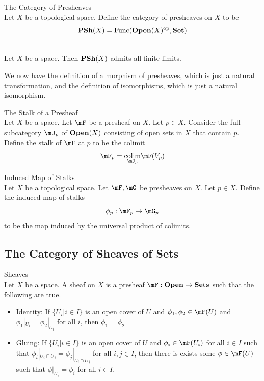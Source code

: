 \documentclass[a4paper]{article}
\begin{document}
\begin{defn}{The Category of Presheaves}{}\\
Let $X$ be a topological space. Define the category of presheaves on $X$ to be $$\bold{PSh}(X)=\text{Func}(\bold{Open}(X)^\text{op},\bold{Set})$$
\end{defn}

\begin{prp}{}{}\\
Let $X$ be a space. Then $\bold{PSh}(X)$ admits all finite limits. 
\end{prp}

We now have the definition of a morphism of presheaves, which is just a natural transformation, and the definition of isomorphisms, which is just a natural isomorphism. 

\begin{defn}{The Stalk of a Presheaf}{}\\
Let $X$ be a space. Let $\mF$ be a presheaf on $X$. Let $p\in X$. Consider the full subcategory $\mJ_p$ of $\bold{Open}(X)$ consisting of open sets in $X$ that contain $p$. Define the stalk of $\mF$ at $p$ to be the colimit $$\mF_p=\underset{\mJ_p}{\text{colim}}\mF(V_p)$$
\end{defn}

\begin{defn}{Induced Map of Stalks}{}\\
Let $X$ be a topological space. Let $\mF,\mG$ be presheaves on $X$. Let $p\in X$. Define the induced map of stalks $$\phi_p:\mF_p\to\mG_p$$ to be the map induced by the universal product of colimits. 
\end{defn}

\subsection{The Category of Sheaves of Sets}
\begin{defn}{Sheaves}{}\\
Let $X$ be a space. A sheaf on $X$ is a presheaf $\mF:\bold{Open}\to\bold{Sets}$ such that the following are true. 
\begin{itemize}
\item Identity: If $\{U_i|i\in I\}$ is an open cover of $U$ and $\phi_1,\phi_2\in\mF(U)$ and $\phi_1|_{U_i}=\phi_2|_{U_i}$ for all $i$, then $\phi_1=\phi_2$
\item Gluing: If $\{U_i|i\in I\}$ is an open cover of $U$ and $\phi_i\in\mF(U_i)$ for all $i\in I$ such that $\phi_i|_{U_i\cap U_j}=\phi_j|_{U_i\cap U_j}$ for all $i,j\in I$, then there is exists some $\phi\in\mF(U)$ such that $\phi|_{U_i}=\phi_i$ for all $i\in I$. 
\end{itemize}
\end{defn}
\end{document}
